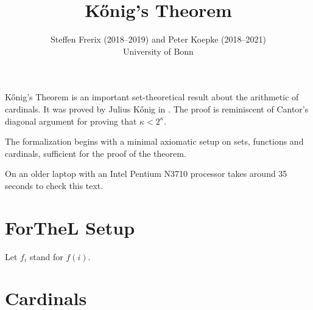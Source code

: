 \documentclass{article}
\title{Kőnig's Theorem}
\author{Steffen Frerix (2018--2019) and Peter Koepke (2018--2021)\\
University of Bonn}
\date{}
\begin{document}
\maketitle

\noindent
Kőnig's Theorem is an important set-theoretical result about the arithmetic of
cardinals.
It was proved by Julius Kőnig in \cite{Koenig1905}.
The proof is reminiscent of Cantor's diagonal argument for proving that $\kappa
< 2^\kappa$.

The formalization begins with a minimal axiomatic setup on sets, functions and
cardinals, sufficient for the proof of the theorem.

On an older laptop with an Intel Pentium N3710 processor \Naproche takes around
35 seconds to check this text.


\section{ForTheL Setup}

\begin{forthel}

  Let $f_{i}$ stand for $f(i)$.
\end{forthel}


\section{Cardinals}
\end{document}
